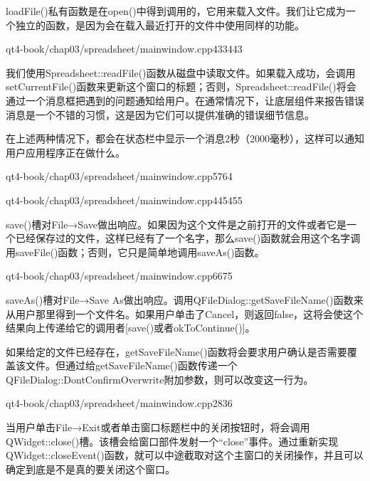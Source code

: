 \documentclass[11pt,oneside]{book}
\begin{document}
\begin{common-format}
loadFile()私有函数是在open()中得到调用的，它用来载入文件。我们让它成为一个独立的函数，是因为会在载入最近打开的文件中使用同样的功能。

\begin{cppline}{qt4-book/chap03/spreadsheet/mainwindow.cpp}{433}{443}
\end{cppline}

我们使用Spreadsheet::readFile()函数从磁盘中读取文件。如果载入成功，会调用setCurrentFile()函数来更新这个窗口的标题；否则，Spreadsheet::readFile()将会通过一个消息框把遇到的问题通知给用户。在通常情况下，让底层组件来报告错误消息是一个不错的习惯，这是因为它们可以提供准确的错误细节信息。

在上述两种情况下，都会在状态栏中显示一个消息2秒（2000毫秒），这样可以通知用户应用程序正在做什么。

\begin{cppline}{qt4-book/chap03/spreadsheet/mainwindow.cpp}{57}{64}
\end{cppline}

\begin{cppline}{qt4-book/chap03/spreadsheet/mainwindow.cpp}{445}{455}
\end{cppline}

save()槽对File→Save做出响应。如果因为这个文件是之前打开的文件或者它是一个已经保存过的文件，这样已经有了一个名字，那么save()函数就会用这个名字调用saveFile()函数；否则，它只是简单地调用saveAs()函数。

\begin{cppline}{qt4-book/chap03/spreadsheet/mainwindow.cpp}{66}{75}
\end{cppline}

saveAs()槽对File→Save As做出响应。调用QFileDialog::getSaveFileName()函数来从用户那里得到一个文件名。如果用户单击了Cancel，则返回false，这将会使这个结果向上传递给它的调用者[save()或者okToContinue()]。

如果给定的文件已经存在，getSaveFileName()函数将会要求用户确认是否需要覆盖该文件。但通过给getSaveFileName()函数传递一个QFileDialog::DontConfirmOverwrite附加参数，则可以改变这一行为。

\begin{cppline}{qt4-book/chap03/spreadsheet/mainwindow.cpp}{28}{36}
\end{cppline}

当用户单击File→Exit或者单击窗口标题栏中的关闭按钮时，将会调用QWidget::close()槽。该槽会给窗口部件发射一个“close”事件。通过重新实现QWidget::closeEvent()函数，就可以中途截取对这个主窗口的关闭操作，并且可以确定到底是不是真的要关闭这个窗口。


\end{common-format}
\end{document}
